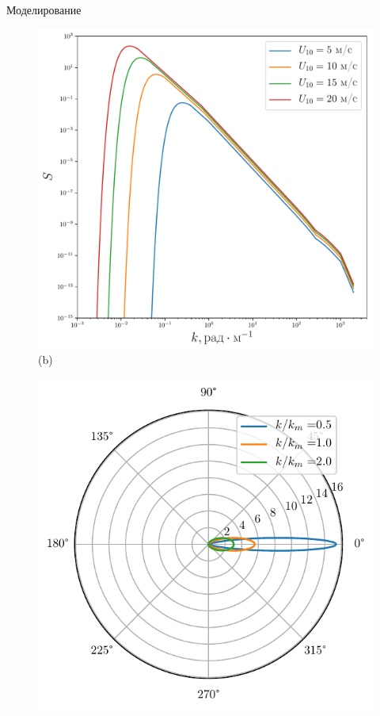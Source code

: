 \begin{frame}[t]{}
\begin{columns}[t]
\begin{column}{.48\linewidth}
\begin{block}{Моделирование}
\begin{figure}[h]
\begin{minipage}{0.24\linewidth}
                \includegraphics[width=\linewidth]{fig/full_spectrum1}
                \centering
                (b)
            \end{minipage}
            \begin{minipage}{0.24\linewidth}
                \includegraphics[width=\linewidth]{fig/full_angles1}

\end{minipage}
\end{figure}
\end{block}
\end{column}
\end{columns}
\end{frame}
